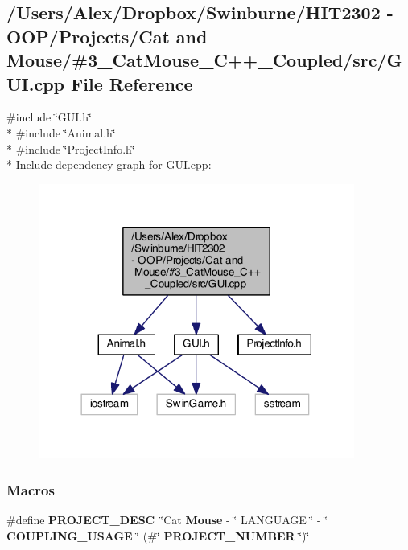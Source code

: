 \subsection{/\-Users/\-Alex/\-Dropbox/\-Swinburne/\-H\-I\-T2302 -\/ O\-O\-P/\-Projects/\-Cat and Mouse/\#3\-\_\-\-Cat\-Mouse\-\_\-\-C++\-\_\-\-Coupled/src/\-G\-U\-I.cpp File Reference}
\label{_g_u_i_8cpp}
{\ttfamily \#include \char`\"{}G\-U\-I.\-h\char`\"{}}\\*
{\ttfamily \#include \char`\"{}Animal.\-h\char`\"{}}\\*
{\ttfamily \#include \char`\"{}Project\-Info.\-h\char`\"{}}\\*
Include dependency graph for G\-U\-I.\-cpp\-:
\nopagebreak
\begin{figure}[H]
\begin{center}
\leavevmode
\includegraphics[width=294pt]{_g_u_i_8cpp__incl}
\end{center}
\end{figure}
\subsubsection*{Macros}
\begin{DoxyCompactItemize}
\item 
\#define {\bf P\-R\-O\-J\-E\-C\-T\-\_\-\-D\-E\-S\-C}~\char`\"{}Cat {\bf Mouse} -\/ \char`\"{} L\-A\-N\-G\-U\-A\-G\-E \char`\"{} -\/ \char`\"{} {\bf C\-O\-U\-P\-L\-I\-N\-G\-\_\-\-U\-S\-A\-G\-E} \char`\"{} (\#\char`\"{} {\bf P\-R\-O\-J\-E\-C\-T\-\_\-\-N\-U\-M\-B\-E\-R} \char`\"{})\char`\"{}
\end{DoxyCompactItemize}


